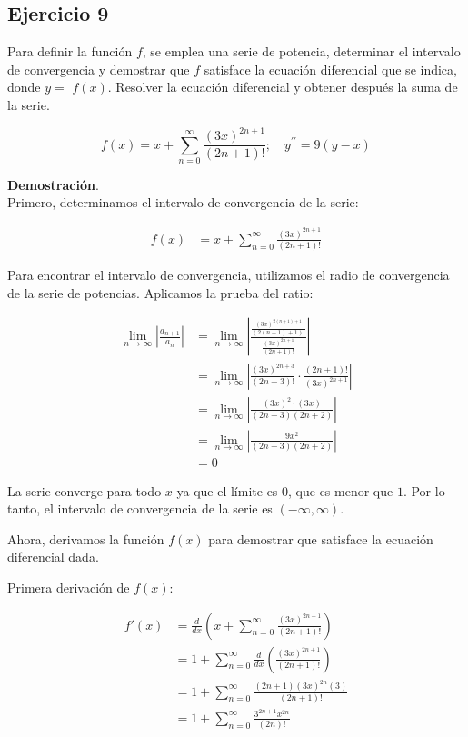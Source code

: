 \documentclass{article}
\begin{document}
    \subsection*{Ejercicio 9}

    Para definir la función $f$, se emplea una serie de potencia, determinar el intervalo de convergencia y demostrar que $f$ satisface la ecuación diferencial que se indica, donde $y=$ $f(x)$. Resolver la ecuación diferencial y obtener después la suma de la serie.

    $$
    f(x)=x+\sum_{n=0}^{\infty} \frac{(3 x)^{2 n+1}}{(2 n+1)!} ; \quad y^{\prime \prime}=9(y-x)
    $$

    \textbf{Demostración}.\\

    Primero, determinamos el intervalo de convergencia de la serie:

    \begin{align*}
    f(x) &= x + \sum_{n=0}^{\infty} \frac{(3x)^{2n+1}}{(2n+1)!}
    \end{align*}

    Para encontrar el intervalo de convergencia, utilizamos el radio de convergencia de la serie de potencias. Aplicamos la prueba del ratio:

    \begin{align*}
    \lim_{n \to \infty} \left| \frac{a_{n+1}}{a_n} \right| &= \lim_{n \to \infty} \left| \frac{\frac{(3x)^{2(n+1)+1}}{(2(n+1)+1)!}}{\frac{(3x)^{2n+1}}{(2n+1)!}} \right| \\
    &= \lim_{n \to \infty} \left| \frac{(3x)^{2n+3}}{(2n+3)!} \cdot \frac{(2n+1)!}{(3x)^{2n+1}} \right| \\
    &= \lim_{n \to \infty} \left| \frac{(3x)^2 \cdot (3x)}{(2n+3)(2n+2)} \right| \\
    &= \lim_{n \to \infty} \left| \frac{9x^2}{(2n+3)(2n+2)} \right| \\
    &= 0
    \end{align*}

    La serie converge para todo $x$ ya que el límite es $0$, que es menor que $1$. Por lo tanto, el intervalo de convergencia de la serie es $(-\infty, \infty)$.

    Ahora, derivamos la función $f(x)$ para demostrar que satisface la ecuación diferencial dada.

    Primera derivación de $f(x)$:

    \begin{align*}
    f'(x) &= \frac{d}{dx} \left( x + \sum_{n=0}^{\infty} \frac{(3x)^{2n+1}}{(2n+1)!} \right) \\
    &= 1 + \sum_{n=0}^{\infty} \frac{d}{dx} \left( \frac{(3x)^{2n+1}}{(2n+1)!} \right) \\
    &= 1 + \sum_{n=0}^{\infty} \frac{(2n+1)(3x)^{2n}(3)}{(2n+1)!} \\
    &= 1 + \sum_{n=0}^{\infty} \frac{3^{2n+1} x^{2n}}{(2n)!}
    \end{align*}
\end{document}
